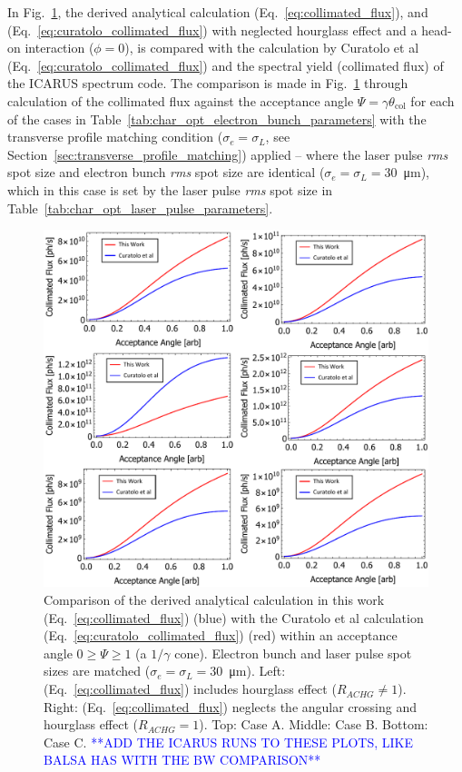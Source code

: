 \documentclass[../main.tex]{subfiles}
\begin{document}
In Fig.~\ref{fig:curatolo_collimated_flux_comparison}, the derived analytical calculation (Eq.~\ref{eq:collimated_flux}), and (Eq.~\ref{eq:curatolo_collimated_flux}) with neglected hourglass effect and a head-on interaction ($\phi = 0$), is compared with the calculation by Curatolo et al \cite{curatolo2017analytical} (Eq.~\ref{eq:curatolo_collimated_flux}) and the spectral yield (collimated flux) of the \textsc{ICARUS} spectrum code. The comparison is made in Fig.~\ref{fig:curatolo_collimated_flux_comparison} through calculation of the collimated flux against the acceptance angle $\Psi = \gamma\theta_{\mathrm{col}}$ for each of the cases in Table~\ref{tab:char_opt_electron_bunch_parameters} with the transverse profile matching condition ($\sigma_{e} = \sigma_{L}$, see Section~\ref{sec:transverse_profile_matching}) applied -- where the laser pulse \textit{rms} spot size and electron bunch \textit{rms} spot size are identical ($\sigma_{e} = \sigma_{L} = 30$~\si{\micro\meter}), which in this case is set by the laser pulse \textit{rms} spot size in Table~\ref{tab:char_opt_laser_pulse_parameters}.    

\begin{figure}[!h]
\centering
\includegraphics[width=\textwidth]{Figures/Optimisation_and_Characterisation_of_Inverse_Compton_Scattering_Sources/Opt_Char_Fcol_Curatolo_Comp_FINAL.pdf}
\caption{Comparison of the derived analytical calculation in this work (Eq.~\ref{eq:collimated_flux}) (blue) with the Curatolo et al \cite{curatolo2017analytical} calculation (Eq.~\ref{eq:curatolo_collimated_flux}) (red) within an acceptance angle $0 \geq \Psi \geq 1$ (a $1/\gamma$ cone). Electron bunch and laser pulse spot sizes are matched ($\sigma_{e}=\sigma_{L}=30$~\si{\micro\meter}). Left: (Eq.~\ref{eq:collimated_flux}) includes hourglass effect ($R_{ACHG}\neq 1$). Right: (Eq.~\ref{eq:collimated_flux}) neglects the angular crossing and hourglass effect ($R_{ACHG} = 1$). Top: Case A. Middle: Case B. Bottom: Case C. \textcolor{blue}{**ADD THE ICARUS RUNS TO THESE PLOTS, LIKE BALSA HAS WITH THE BW COMPARISON**}}
\label{fig:curatolo_collimated_flux_comparison}
\end{figure}
\end{document}

